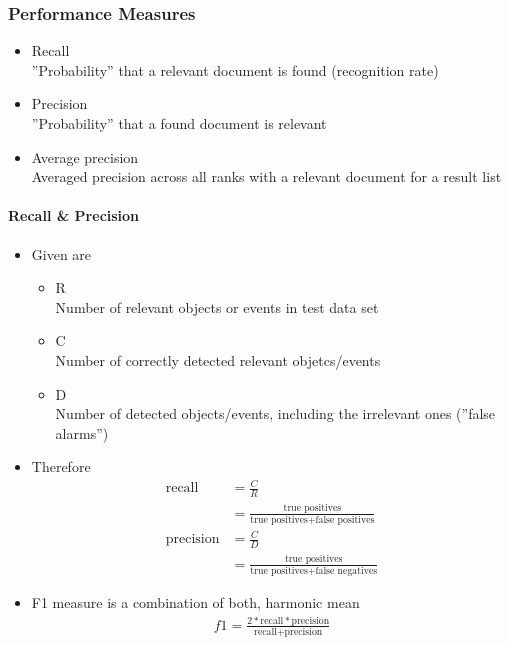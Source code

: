 \documentclass{scrartcl}
\begin{document}
\subsubsection{Performance Measures}

\begin{itemize}
	\item Recall \\
	''Probability'' that a relevant document is found (recognition rate)
	\item Precision \\
	''Probability'' that a found document is relevant
	\item Average precision \\
	Averaged precision across all ranks with a relevant document for a result list
\end{itemize}

\paragraph{Recall \& Precision}

\begin{itemize}
	\item Given are
	\begin{itemize}
		\item R \\
		Number of relevant objects or events in test data set
		\item C \\
		Number of correctly detected relevant objetcs/events
		\item D \\
		Number of detected objects/events, including the irrelevant ones (''false alarms'')
	\end{itemize}
	\item Therefore
	\begin{align*}
		\text{recall} &= \frac{C}{R} \\
		&= \frac{\text{true positives}}{\text{true positives}+\text{false positives}} \\
		\text{precision} &= \frac{C}{D} \\
		&= \frac{\text{true positives}}{\text{true positives}+\text{false negatives}}
	\end{align*}
	\item F1 measure is a combination of both, harmonic mean
	\begin{align*}
		f1=\frac{2*\text{recall}*\text{precision}}{\text{recall}+\text{precision}}
	\end{align*}
\end{itemize}
\end{document}
